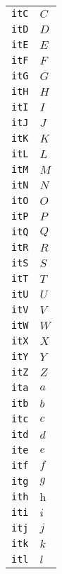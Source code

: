 \begin{longtable}{ll}
\texttt{itC}&${}{\textit{C}}{}$\\
\texttt{itD}&${}{\textit{D}}{}$\\
\texttt{itE}&${}{\textit{E}}{}$\\
\texttt{itF}&${}{\textit{F}}{}$\\
\texttt{itG}&${}{\textit{G}}{}$\\
\texttt{itH}&${}{\textit{H}}{}$\\
\texttt{itI}&${}{\textit{I}}{}$\\
\texttt{itJ}&${}{\textit{J}}{}$\\
\texttt{itK}&${}{\textit{K}}{}$\\
\texttt{itL}&${}{\textit{L}}{}$\\
\texttt{itM}&${}{\textit{M}}{}$\\
\texttt{itN}&${}{\textit{N}}{}$\\
\texttt{itO}&${}{\textit{O}}{}$\\
\texttt{itP}&${}{\textit{P}}{}$\\
\texttt{itQ}&${}{\textit{Q}}{}$\\
\texttt{itR}&${}{\textit{R}}{}$\\
\texttt{itS}&${}{\textit{S}}{}$\\
\texttt{itT}&${}{\textit{T}}{}$\\
\texttt{itU}&${}{\textit{U}}{}$\\
\texttt{itV}&${}{\textit{V}}{}$\\
\texttt{itW}&${}{\textit{W}}{}$\\
\texttt{itX}&${}{\textit{X}}{}$\\
\texttt{itY}&${}{\textit{Y}}{}$\\
\texttt{itZ}&${}{\textit{Z}}{}$\\
\texttt{ita}&${}{\textit{a}}{}$\\
\texttt{itb}&${}{\textit{b}}{}$\\
\texttt{itc}&${}{\textit{c}}{}$\\
\texttt{itd}&${}{\textit{d}}{}$\\
\texttt{ite}&${}{\textit{e}}{}$\\
\texttt{itf}&${}{\textit{f}}{}$\\
\texttt{itg}&${}{\textit{g}}{}$\\
\texttt{ith}&${}{\textit{h}}{}$\\
\texttt{iti}&${}{\textit{i}}{}$\\
\texttt{itj}&${}{\textit{j}}{}$\\
\texttt{itk}&${}{\textit{k}}{}$\\
\texttt{itl}&${}{\textit{l}}{}$\\

\end{longtable}
